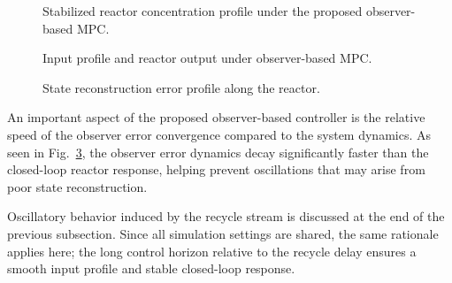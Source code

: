 \begin{figure}[!htbp]
    \centering
    
    \caption{Stabilized reactor concentration profile under the proposed observer-based MPC.}
    \label{fig:closed_ECC}
\end{figure}

\begin{figure}[!htbp]
    \centering
    
    \caption{Input profile and reactor output under observer-based MPC.}
    \label{fig:input_ECC}
\end{figure}

\begin{figure}[!htbp]
    \centering
    
    \caption{State reconstruction error profile along the reactor.}
    \label{fig:error_ECC}
\end{figure}

An important aspect of the proposed observer-based controller is the relative speed of the observer error convergence compared to the system dynamics. As seen in Fig.~\ref{fig:error_ECC}, the observer error dynamics decay significantly faster than the closed-loop reactor response, helping prevent oscillations that may arise from poor state reconstruction.

Oscillatory behavior induced by the recycle stream is discussed at the end of the previous subsection. Since all simulation settings are shared, the same rationale applies here; the long control horizon relative to the recycle delay ensures a smooth input profile and stable closed-loop response.
